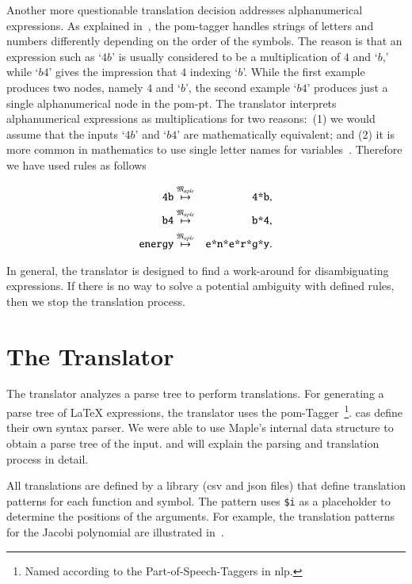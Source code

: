 \documentclass[a4paper,11pt]{article}
\newcommand{\Maple}{Maple}
\newcommand{\langMaple}{\mathfrak{M}_{aple}}
\theoremstyle{defTheoStyle}
\theoremstyle{defExampStyle}
\begin{document}
	Another more questionable translation decision addresses alphanumerical expressions. As explained in~, the \gls*{pom}-tagger handles strings of letters and numbers differently depending on the order of the symbols. The reason is that an expression such as `$4b$' is usually considered to be a multiplication of $4$ and `$b$,' while `$b4$' gives the impression that $4$ indexing `$b$'. While the first example produces two nodes, namely $4$ and `$b$', the second example `$b4$' produces just a single alphanumerical node in the \gls*{pom-pt}. The translator interprets alphanumerical expressions as multiplications for two reasons:~(1) we would assume that the inputs `$4b$' and `$b4$' are mathematically equivalent; and (2) it is more common in mathematics to use single letter names for variables~\parencite{Notation:History}. Therefore we have used rules as follows
	
	\begin{eqnarray*}
		\verb|4b| & \overset{\langMaple}{\mapsto} & \verb|4*b|,\\
		\verb|b4| & \overset{\langMaple}{\mapsto} & \verb|b*4|,\\
		\verb|energy| & \overset{\langMaple}{\mapsto} & \verb|e*n*e*r*g*y|.
	\end{eqnarray*}
	
	In general, the translator is designed to find a work-around for disambiguating expressions. 
	If there is no way to solve a potential ambiguity with defined rules, then we stop the translation process.
	
	\section{The Translator}
	The translator analyzes a parse tree to perform translations. For generating a parse tree of \LaTeX{} expressions, the translator uses the \gls*{pom}-Tagger~\parencite{POM-Tagger}\footnote{Named according to the Part-of-Speech-Taggers in \gls*{nlp}.}. \gls*{cas} define their own syntax parser. We were able to use \Maple's internal data structure to 
	obtain a parse tree of the input.  and  will explain the parsing and translation process in detail.
	
	All translations are defined by a library (\gls*{csv} and \gls*{json} files) that define translation patterns for each function and symbol. The pattern uses \verb|$i| as a placeholder to determine the positions of the arguments. For example, the translation patterns for the Jacobi polynomial are illustrated in~.
	
\end{document}
